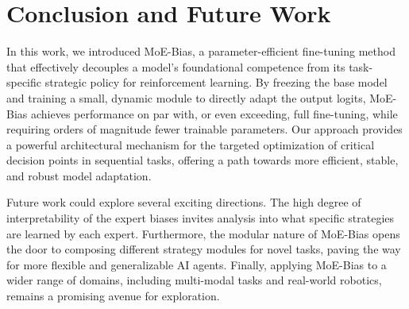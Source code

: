 \documentclass[a4paper]{article}
\begin{document}
\section{Conclusion and Future Work}

In this work, we introduced MoE-Bias, a parameter-efficient fine-tuning method that effectively decouples a model's foundational competence from its task-specific strategic policy for reinforcement learning. By freezing the base model and training a small, dynamic module to directly adapt the output logits, MoE-Bias achieves performance on par with, or even exceeding, full fine-tuning, while requiring orders of magnitude fewer trainable parameters. Our approach provides a powerful architectural mechanism for the targeted optimization of critical decision points in sequential tasks, offering a path towards more efficient, stable, and robust model adaptation.

Future work could explore several exciting directions. The high degree of interpretability of the expert biases invites analysis into what specific strategies are learned by each expert. Furthermore, the modular nature of MoE-Bias opens the door to composing different strategy modules for novel tasks, paving the way for more flexible and generalizable AI agents. Finally, applying MoE-Bias to a wider range of domains, including multi-modal tasks and real-world robotics, remains a promising avenue for exploration.



%  
\end{document}
